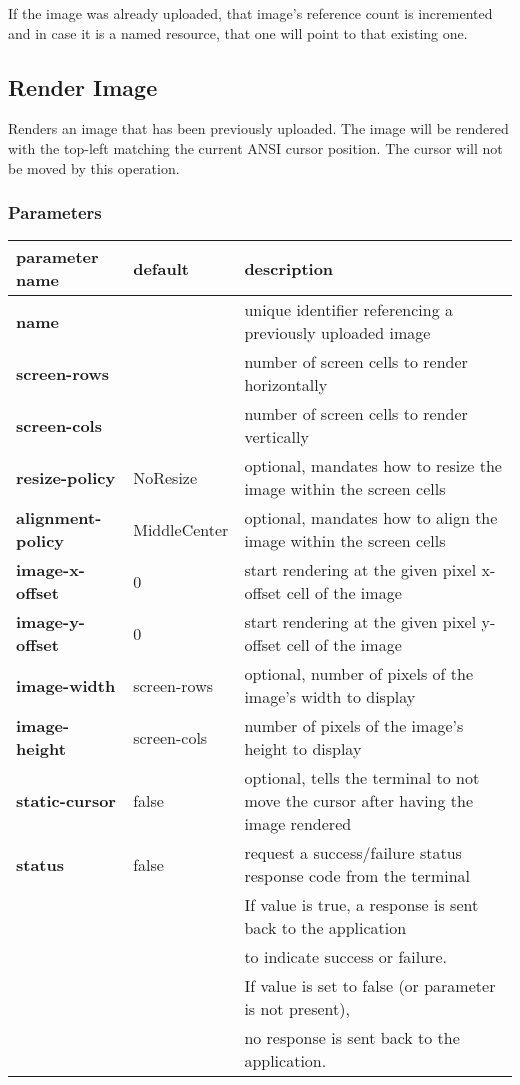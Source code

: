 \documentclass[a4paper]{article}
\begin{document}
If the image was already uploaded, that image's reference count is incremented
and in case it is a named resource, that one will point to that existing one.

\subsection{Render Image} %

Renders an image that has been previously uploaded.
The image will be rendered with the top-left matching the current ANSI cursor position.
The cursor will not be moved by this operation.

\subsubsection*{Parameters}

\begin{tabular}{|l|l|l|}
    \hline
    \textbf{parameter name} & \textbf{default} & \textbf{description} \\
    \hline
    \textbf{name} &           & unique identifier referencing a previously uploaded image \\
    \textbf{screen-rows} &    & number of screen cells to render horizontally \\
    \textbf{screen-cols} &    & number of screen cells to render vertically \\
    \textbf{resize-policy} & NoResize & optional, mandates how to resize the image within the screen cells \\
    \textbf{alignment-policy} & MiddleCenter & optional, mandates how to align the image within the screen cells \\
    \textbf{image-x-offset} & 0 & start rendering at the given pixel x-offset cell of the image \\
    \textbf{image-y-offset} & 0 & start rendering at the given pixel y-offset cell of the image \\
    \textbf{image-width}    & screen-rows & optional, number of pixels of the image's width to display \\
    \textbf{image-height}   & screen-cols & number of pixels of the image's height to display \\
    \textbf{static-cursor}  & false & optional, tells the terminal to not move the cursor after having the image rendered \\
    \textbf{status}         & false & request a success/failure status response code from the terminal \\
        & & If value is true, a response is sent back to the application \\
        & & to indicate success or failure. \\
        & & If value is set to false (or parameter is not present), \\
        & & no response is sent back to the application. \\
    \hline
\end{tabular}
\end{document}
